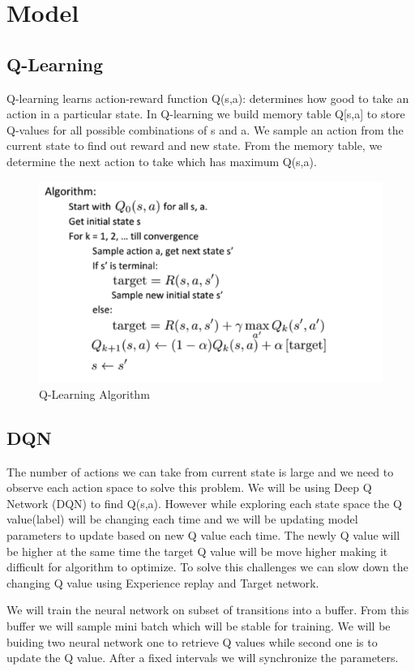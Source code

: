 \section{Model}
\label{sec:Model}


\subsection{Q-Learning}
Q-learning learns action-reward function Q(s,a): determines how good to take an action in a particular state. In Q-learning we build memory table Q[s,a] to store Q-values for all possible combinations of s and a. We sample an action from the current state to find out reward  and new state. From the memory table, we determine the next action to take which has maximum Q(s,a).

\begin{figure}%
\centering
\includegraphics[width=0.6\columnwidth]{figures/Q-learning.png}%
\caption{Q-Learning Algorithm}%
\label{fig:datastats}%
\end{figure}


\subsection{DQN}
The number of actions we can take from current state is large and we need to observe each action space to solve this problem. We will be using Deep Q Network (DQN) to find Q(s,a). However while exploring each state space the Q value(label) will be changing each time and we will be updating model parameters to update based on new Q value each time. The newly Q value will be higher at the same time the target Q value will be move higher making it difficult for algorithm to optimize. To solve this challenges we can slow down the changing Q value using Experience replay and Target network.

We will train the neural network on subset of transitions into a buffer. From this buffer we will sample mini batch which will be stable for training. We will be buiding two neural network one to retrieve Q values while second one is to update the Q value. After a fixed intervals we will synchronize the parameters. 

